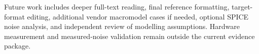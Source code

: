 Future work includes deeper full-text reading, final reference formatting, target-format editing, additional vendor macromodel cases if needed, optional SPICE noise analysis, and independent review of modelling assumptions. Hardware measurement and measured-noise validation remain outside the current evidence package.
